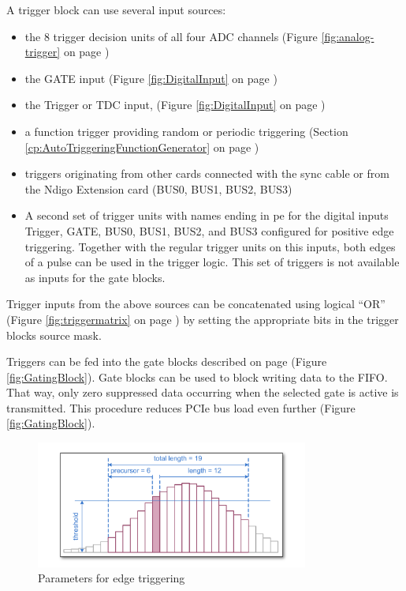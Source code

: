 		A trigger block can use several input sources:

		\begin{itemize}
			\item the 8 trigger decision units of all four ADC channels (Figure \ref{fig:analog-trigger} on page \pageref{fig:analog-trigger})
			\item the GATE input (Figure \ref{fig:DigitalInput} on page \pageref{fig:DigitalInput})
			\item the Trigger or TDC input,  (Figure \ref{fig:DigitalInput} on page \pageref{fig:DigitalInput})
			\item a function trigger providing random or periodic triggering (Section \ref{cp:AutoTriggeringFunctionGenerator} on page \pageref{cp:AutoTriggeringFunctionGenerator})
			\item triggers originating from other cards connected with the sync cable or from the Ndigo Extension card (BUS0, BUS1, BUS2, BUS3)
			\item A second set of trigger units with names ending in \textsf{\tu pe} for the digital inputs Trigger, GATE, BUS0, BUS1, BUS2, and BUS3 configured for positive edge triggering. Together with the regular trigger units on this inputs, both edges of a pulse can be used in the trigger logic. This set of triggers is not available as inputs for the gate blocks.
		\end{itemize}

		Trigger inputs from the above sources can be concatenated using logical ``OR'' (Figure \ref{fig:triggermatrix} on page \pageref{fig:triggermatrix}) by setting the appropriate bits in the trigger blocks source mask.\par
		
Triggers can be fed into the gate blocks described on page \pageref{fig:GatingBlock} (Figure \ref{fig:GatingBlock}). Gate blocks can be used to block writing data to the FIFO. That way, only zero suppressed data occurring when the selected gate is active is transmitted. This procedure reduces PCIe bus load even further (Figure \ref{fig:GatingBlock}).

		\begin{figure}[ht]
			\begin{center}
				\includegraphics[width=0.8\textwidth]{figures/edge-trigger.pdf}
				\caption{Parameters for edge triggering\label{fig:edge-trigger}}
			\end{center}
		\end{figure}
		
